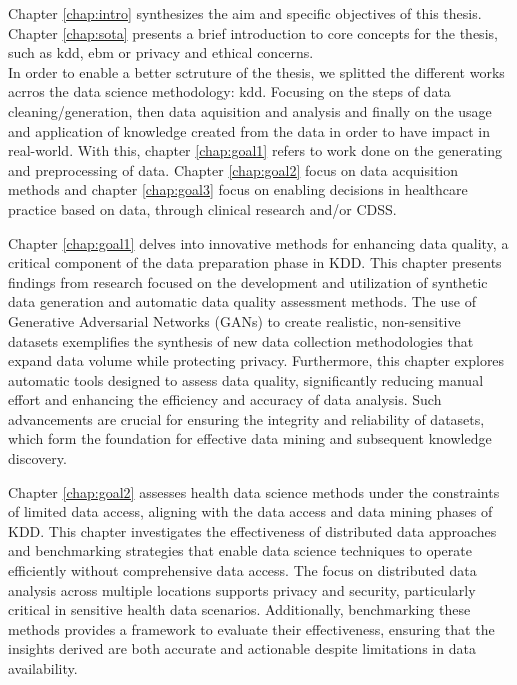 Chapter \ref{chap:intro} synthesizes the aim and specific objectives of this thesis.
Chapter \ref{chap:sota} presents a brief introduction to core concepts for the thesis, such as \ac{kdd}, \ac{ebm} or privacy and ethical concerns.\\
In order to enable a better sctruture of the thesis, we splitted the different works acrros the data science methodology: \ac{kdd}. Focusing on the steps of data cleaning/generation, then data aquisition and analysis and finally on the usage and application of knowledge created from the data in order to have impact in real-world. With this, chapter \ref{chap:goal1} refers to work done on the generating  and preprocessing of data. Chapter \ref{chap:goal2} focus on data acquisition methods and chapter \ref{chap:goal3} focus on enabling decisions in healthcare practice based on data, through clinical research and/or CDSS. 

Chapter \ref{chap:goal1} delves into innovative methods for enhancing data quality, a critical component of the data preparation phase in KDD. This chapter presents findings from research focused on the development and utilization of synthetic data generation and automatic data quality assessment methods. The use of Generative Adversarial Networks (GANs) to create realistic, non-sensitive datasets exemplifies the synthesis of new data collection methodologies that expand data volume while protecting privacy. Furthermore, this chapter explores automatic tools designed to assess data quality, significantly reducing manual effort and enhancing the efficiency and accuracy of data analysis. Such advancements are crucial for ensuring the integrity and reliability of datasets, which form the foundation for effective data mining and subsequent knowledge discovery.

Chapter \ref{chap:goal2} assesses health data science methods under the constraints of limited data access, aligning with the data access and data mining phases of KDD. This chapter investigates the effectiveness of distributed data approaches and benchmarking strategies that enable data science techniques to operate efficiently without comprehensive data access. The focus on distributed data analysis across multiple locations supports privacy and security, particularly critical in sensitive health data scenarios. Additionally, benchmarking these methods provides a framework to evaluate their effectiveness, ensuring that the insights derived are both accurate and actionable despite limitations in data availability.

